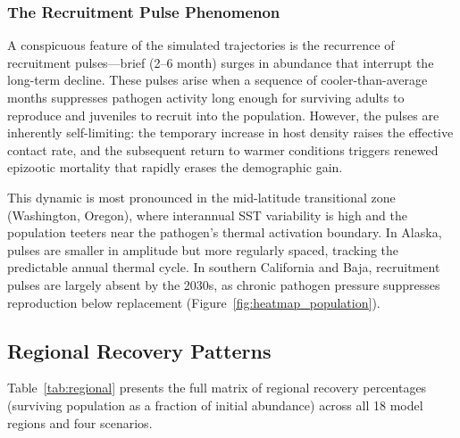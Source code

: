 \subsubsection{The Recruitment Pulse Phenomenon}

A conspicuous feature of the simulated trajectories is the recurrence
of recruitment pulses---brief (2--6 month) surges in abundance that
interrupt the long-term decline.  These pulses arise when a sequence of
cooler-than-average months suppresses pathogen activity long enough for
surviving adults to reproduce and juveniles to recruit into the
population.  However, the pulses are inherently self-limiting: the
temporary increase in host density raises the effective contact rate,
and the subsequent return to warmer conditions triggers renewed
epizootic mortality that rapidly erases the demographic gain.

This dynamic is most pronounced in the mid-latitude transitional zone
(Washington, Oregon), where interannual SST variability is high and
the population teeters near the pathogen's thermal activation boundary.
In Alaska, pulses are smaller in amplitude but more regularly spaced,
tracking the predictable annual thermal cycle.  In southern California
and Baja, recruitment pulses are largely absent by the 2030s, as
chronic pathogen pressure suppresses reproduction below replacement
(Figure~\ref{fig:heatmap_population}).

\subsection{Regional Recovery Patterns}
\label{sec:regional}

Table~\ref{tab:regional} presents the full matrix of regional recovery
percentages (surviving population as a fraction of initial abundance)
across all 18 model regions and four scenarios.

